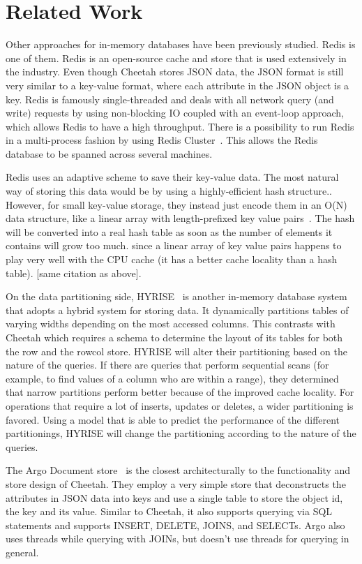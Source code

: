 \documentclass[11pt,journal,compsoc]{IEEEtran}
\begin{document}
\section{Related Work}
Other approaches for in-memory databases have been previously studied. Redis is one of them. Redis is an open-source cache and store that is used extensively in the industry. Even though Cheetah stores JSON data, the JSON format is still very similar to a key-value format, where each attribute in the JSON object is a key. Redis is famously single-threaded and deals with all network query (and write) requests by using non-blocking IO coupled with an event-loop approach, which allows Redis to have a high throughput. There is a possibility to run Redis in a multi-process fashion by using Redis Cluster~\cite{redis-cluster}. This allows the Redis database to be spanned across several machines.

Redis uses an adaptive scheme to save their key-value data. The most natural way of storing this data would be by using a highly-efficient hash structure.. However, for small key-value storage, they instead just encode them in an O(N) data structure, like a linear array with length-prefixed key value pairs~\cite{redis}. The hash will be converted into a real hash table as soon as the number of elements it contains will grow too much. since a linear array of key value pairs happens to play very well with the CPU cache (it has a better cache locality than a hash table). [same citation as above].

On the data partitioning side, HYRISE~\cite{hyrise} is another in-memory database system that adopts a hybrid system for storing data. It dynamically partitions tables of varying widths depending on the most accessed columns. This contrasts with Cheetah which requires a schema to determine the layout of its tables for both the row and the rowcol store. HYRISE will alter their partitioning based on the nature of the queries. If there are queries that perform sequential scans (for example, to find values of a column who are within a range), they determined that narrow partitions perform better because of the improved cache locality. For operations that require a lot of inserts, updates or deletes, a wider partitioning is favored. Using a model that is able to predict the performance of the different partitionings, HYRISE will change the partitioning according to the nature of the queries. 


The Argo Document store~\cite{argo} is the closest architecturally to the functionality and store design of Cheetah. They employ a very simple store that deconstructs the attributes in JSON data into keys and use a single table to store the object id, the key and its value. Similar to Cheetah, it also supports querying via SQL statements and supports INSERT, DELETE, JOINS, and SELECTs. Argo also uses threads while querying with JOINs, but doesn’t use threads for querying in general.
\end{document}
